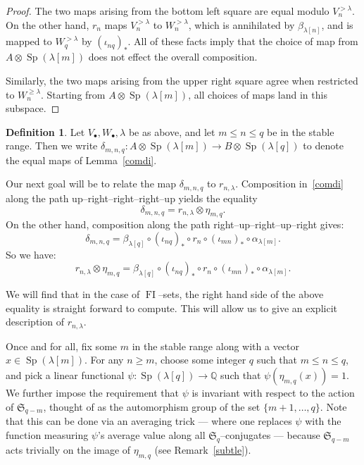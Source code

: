 \documentclass[10pt]{amsart}
\DeclareMathOperator{\FI}{FI}
\DeclareMathOperator{\Sp}{Sp}
\newcommand{\Sn}{\mathfrak{S}}
\newcommand{\as}{\text{*}}
\newcommand{\Q}{\mathbb{Q}}
\newcommand{\dt}{\bullet}
\theoremstyle{definition}
\newtheorem{definition}[theorem]{Definition}
\begin{document}
\begin{proof}
The two maps arising from the bottom left square are equal modulo $V^{> \lambda}_n$. On the other hand, $r_n$ maps $V^{> \lambda}_n$ to $W^{> \lambda}_n$, which is annihilated by $\beta_{\lambda[n]}$, and is mapped to $W^{> \lambda}_q$ by $(\iota_{nq})_\as$. All of these facts imply that the choice of map from $A \otimes \Sp(\lambda[m])$ does not effect the overall composition.

Similarly, the two maps arising from the upper right square agree when restricted to $W^{\geq \lambda}_n$. Starting from $A \otimes \Sp(\lambda[m])$, all choices of maps land in this subspace.
\end{proof}

\begin{definition}
Let $V_\dt,W_\dt,\lambda$ be as above, and let $m \leq n \leq q$ be in the stable range. Then we write $\delta_{m,n,q}: A \otimes \Sp(\lambda[m]) \rightarrow B \otimes \Sp(\lambda[q])$ to denote the equal maps of Lemma~\ref{comdi}.
\end{definition}

Our next goal will be to relate the map $\delta_{m,n,q}$ to $r_{n,\lambda}$. Composition in~\eqref{comdi} along the path up--right--right--right--up yields the equality
\[
\delta_{m,n,q} = r_{n,\lambda} \otimes \eta_{m,q}.
\]
On the other hand, composition along the path right--up--right--up--right gives:
\[
\delta_{m,n,q} = \beta_{\lambda[q]} \circ (\iota_{nq})_\ast \circ r_n \circ (\iota_{mn})_\ast \circ \alpha_{\lambda[m]}.
\]
So we have:
\begin{equation}
r_{n,\lambda} \otimes \eta_{m,q} = \beta_{\lambda[q]} \circ (\iota_{nq})_\ast \circ r_n \circ (\iota_{mn})_\ast \circ \alpha_{\lambda[m]}.\label{key}
\end{equation}

We will find that in the case of $\FI$--sets, the right hand side of the above equality is straight forward to compute. This will allow us to give an explicit description of $r_{n,\lambda}$.

Once and for all, fix some $m$ in the stable range along with a vector $x \in \Sp(\lambda[m])$. For any $n \geq m$, choose some integer $q$ such that $m \leq n \leq q$, and pick a linear functional $\psi: \Sp(\lambda[q]) \rightarrow \Q$ such that $\psi(\eta_{m,q}(x)) = 1$. We further impose the requirement that $\psi$ is invariant with respect to the action of $\Sn_{q-m}$, thought of as the automorphism group of the set $\{m+1,\ldots,q\}$. Note that this can be done via an averaging trick --- where one replaces $\psi$ with the function measuring $\psi$'s average value along all $\Sn_q$--conjugates --- because $\Sn_{q-m}$ acts trivially on the image of $\eta_{m,q}$ (see Remark~\ref{subtle}).
\end{document}
